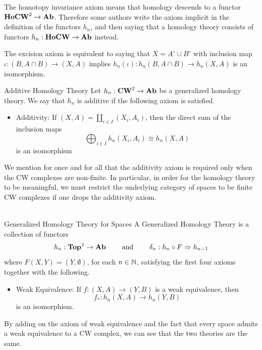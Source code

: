 \documentclass[a4paper]{article}
\begin{document}
The homotopy invariance axiom means that homology descends to a functor $\bold{HoCW}^2\to\bold{Ab}$. Therefore some authors write the axiom implicit in the definition of the functors $h_n$, and then saying that a homology theory consists of functors $h_n:\bold{HoCW}\to\bold{Ab}$ instead. 

\begin{lmm}{}{} The excision axiom is equivalent to saying that $X=A^\circ\cup B^\circ$ with inclusion map $\iota:(B,A\cap B)\to (X,A)$ implies $h_n(\iota):h_n(B,A\cap B)\to h_n(X,A)$ is an isomorphism. 
\end{lmm}

\begin{defn}{Additive Homology Theory}{} Let $h_n:\bold{CW}^2\to\bold{Ab}$ be a generalized homology theory. We say that $h_n$ is additive if the following axiom is satisfied. 
\begin{itemize}
\item Additivity: If $(X,A)=\coprod_{i\in I}(X_i,A_i)$, then the direct sum of the inclusion maps $$\bigoplus_{i\in I}h_n(X_i,A_i)\cong h_n(X,A)$$ is an isomorphism
\end{itemize}
\end{defn}

We mention for once and for all that the additivity axiom is required only when the CW complexes are non-finite. In particular, in order for the homology theory to be meaningful, we must restrict the underlying category of spaces to be finite CW complexes if one drops the additivity axiom. \\~\\

\begin{defn}{Generalized Homology Theory for Spaces}{} A Generalized Homology Theory is a collection of functors $$h_n:\bold{Top}^2\to\bold{Ab}\;\;\;\;\;\;\;\text{ and }\;\;\;\;\;\;\;\delta_n:h_n\circ F\Rightarrow h_{n-1}$$ where $F(X,Y)=(Y,\emptyset)$, for each $n\in\mathbb{N}$, satisfying the first four axioms together with the following. 
\begin{itemize}
\item Weak Equivalence: If $f:(X,A)\to(Y,B)$ is a weak equivalence, then $$f_\ast:h_n(X,A)\to h_n(Y,B)$$ is an isomorphism. 
\end{itemize}
\end{defn}

By adding on the axiom of weak equivalence and the fact that every space admits a weak equivalence to a CW complex, we can see that the two theories are the same. 
\end{document}
